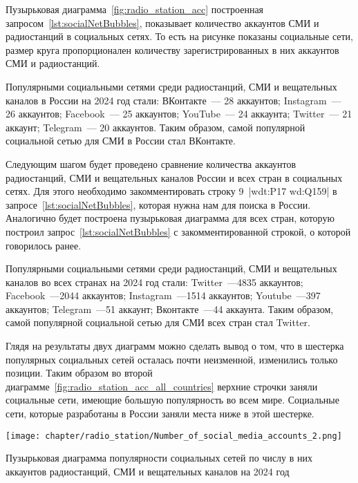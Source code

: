 Пузырьковая диаграмма~\ref{fig:radio_station_acc} построенная запросом~\ref{lst:socialNetBubbles}, показывает количество аккаунтов СМИ и радиостанций в социальных сетях. То есть на рисунке показаны социальные сети, размер круга пропорционален количеству зарегистрированных в них аккаунтов СМИ и радиостанций.

Популярными социальными сетями среди радиостанций, СМИ и вещательных каналов в России на 2024 год стали: 
ВКонтакте~--- 28 аккаунтов; 
Instagram~--- 26 аккаунтов; 
Facebook~--- 25 аккаунтов; 
YouTube~--- 24 аккаунта; 
Twitter~--- 21 аккаунт; 
Telegram~--- 20 аккаунтов. 
Таким образом, самой популярной социальной сетью для СМИ в России стал ВКонтакте.

Следующим шагом будет проведено сравнение количества аккаунтов радиостанций, СМИ и вещательных каналов России и всех стран в социальных сетях. Для этого необходимо закомментировать строку 9~\lstline|wdt:P17 wd:Q159| в запросе~\ref{lst:socialNetBubbles}, которая нужна нам для поиска в России.  Аналогично будет построена пузырьковая диаграмма для всех стран, которую построил запрос~\ref{lst:socialNetBubbles} с закомментированной строкой, о которой говорилось ранее. 

Популярными социальными сетями среди радиостанций, СМИ и вещательных каналов во всех странах на 2024 год стали:
Twitter~---4835 аккаунтов;
Facebook~---2044 аккаунтов;
Instagram~---1514 аккаунтов;
Youtube~---397 аккаунтов;
Telegram~---51 аккаунт;
Вконтакте~---44 аккаунта.
Таким образом, самой популярной социальной сетью для СМИ всех стран стал Twitter.

Глядя на результаты двух диаграмм можно сделать вывод о том, что в шестерка популярных социальных сетей осталась почти неизменной, изменились только позиции. Таким образом во второй диаграмме~\ref{fig:radio_station_acc_all_countries}  верхние строчки заняли социальные сети, имеющие большую популярность во всем мире. Социальные сети, которые разработаны в России заняли места ниже в этой шестерке. 



\begin{marginfigure}[1\baselineskip]
{\texttt{[image: chapter/radio\_station/Number\_of\_social\_media\_accounts\_2.png]}}
\vspace{-7pt}
\caption{Пузырьковая диаграмма популярности социальных сетей по числу в них аккаунтов радиостанций, СМИ и вещательных каналов на 2024 год}%
\label{fig:radio_station_acc}
\end{marginfigure}

